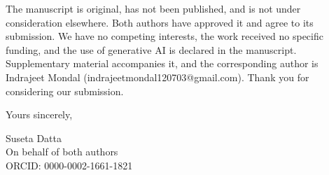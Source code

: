 \documentclass[11pt]{article}
\begin{document}
The manuscript is original, has not been published, and is not under
consideration elsewhere. Both authors have approved it and agree to its
submission. We have no competing interests, the work received no specific
funding, and the use of generative AI is declared in the manuscript.
Supplementary material accompanies it, and the corresponding author is
Indrajeet Mondal (indrajeetmondal120703@gmail.com). Thank you for
considering our submission.

Yours sincerely,

Suseta Datta\\
On behalf of both authors\\
ORCID: 0000-0002-1661-1821
\end{document}
